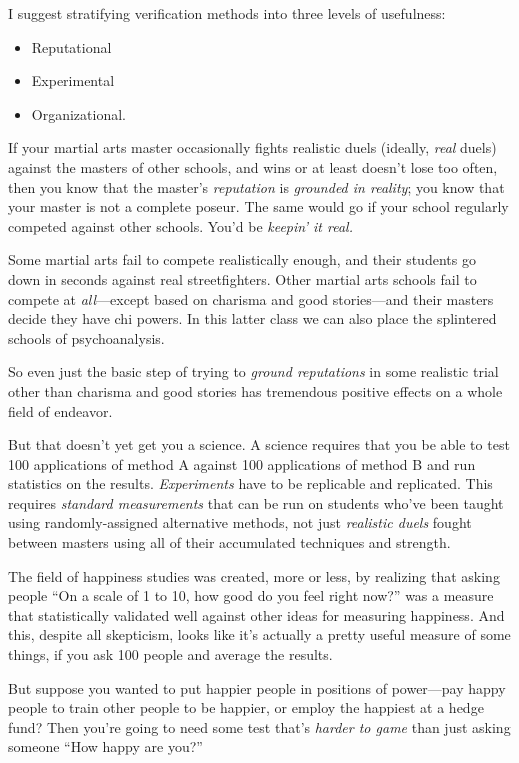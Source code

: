 {
 I suggest stratifying verification methods into three levels of
usefulness:}

\begin{itemize}
\item  Reputational
\item  Experimental
\item  Organizational.
\end{itemize}

{
 If your martial arts master occasionally fights realistic duels
(ideally, \textit{real} duels) against the masters of other schools,
and wins or at least doesn't lose too often, then you
know that the master's \textit{reputation} is
\textit{grounded in reality}; you know that your master is not a
complete poseur. The same would go if your school regularly competed
against other schools. You'd be
\textit{keepin' it real.}}

{
 Some martial arts fail to compete realistically enough, and their
students go down in seconds against real streetfighters. Other martial
arts schools fail to compete at \textit{all}{}---except based on
charisma and good stories---and their masters decide they have chi
powers. In this latter class we can also place the splintered schools
of psychoanalysis.}

{
 So even just the basic step of trying to \textit{ground
reputations} in some realistic trial other than charisma and good
stories has tremendous positive effects on a whole field of endeavor.}

{
 But that doesn't yet get you a science. A science
requires that you be able to test 100 applications of method A against
100 applications of method B and run statistics on the results.
\textit{Experiments} have to be replicable and replicated. This
requires \textit{standard measurements} that can be run on students
who've been taught using randomly-assigned alternative
methods, not just \textit{realistic duels} fought between masters using
all of their accumulated techniques and strength.}

{
 The field of happiness studies was created, more or less, by
realizing that asking people ``On a scale of 1 to 10,
how good do you feel right now?'' was a measure that
statistically validated well against other ideas for measuring
happiness. And this, despite all skepticism, looks like
it's actually a pretty useful measure of some things,
if you ask 100 people and average the results.}

{
 But suppose you wanted to put happier people in positions of
power---pay happy people to train other people to be happier, or employ
the happiest at a hedge fund? Then you're going to need
some test that's \textit{harder to game} than just
asking someone ``How happy are
you?''}

